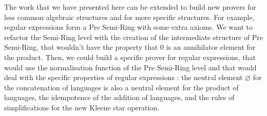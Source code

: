 The work that we have presented here can be extended to build new provers for less common algebraic structures and for more specific structures. For example, regular expressions form a Pre Semi-Ring with some extra axioms. We want to refactor the Semi-Ring level with the creation of the intermediate structure of Pre Semi-Ring, that wouldn't have the property that $0$ is an annihilator element for the product. Then, we could build a specific prover for regular expressions, that would use the normalisation function of the Pre Semi-Ring level and that would deal with the specific properties of regular expressions : the neutral element $\varnothing$ for the concatenation of languages is also a neutral element for the product of languages, the idempotence of the addition of languages, and the rules of simplifications for the new Kleene star operation.


